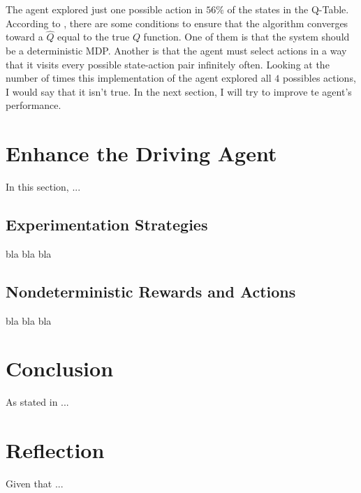 \documentclass[a4paper]{article}
\begin{document}
The agent explored just one possible action in $56\%$ of the states in the Q-Table. According to \cite{Mitchell}, there are some conditions to ensure that the algorithm converges toward a $\hat{Q}$ equal to the true $Q$ function. One of them is that the system should be a deterministic MDP. Another is that the agent must select actions in a way that it visits every possible state-action pair infinitely often. Looking at the number of times this implementation of the agent explored all $4$ possibles actions, I would say that it isn't true. In the next section, I will try to improve te agent's performance.


\section{Enhance the Driving Agent}
\label{sec:enhance_driving_agent}
In this section, ...

\subsection{Experimentation Strategies}
bla bla bla

\subsection{Nondeterministic Rewards and Actions}
bla bla bla


\section{Conclusion}
\label{sec:conclusion}

As stated in ...


\section{Reflection}
\label{sec:reflection}
Given that ...






\end{document}
